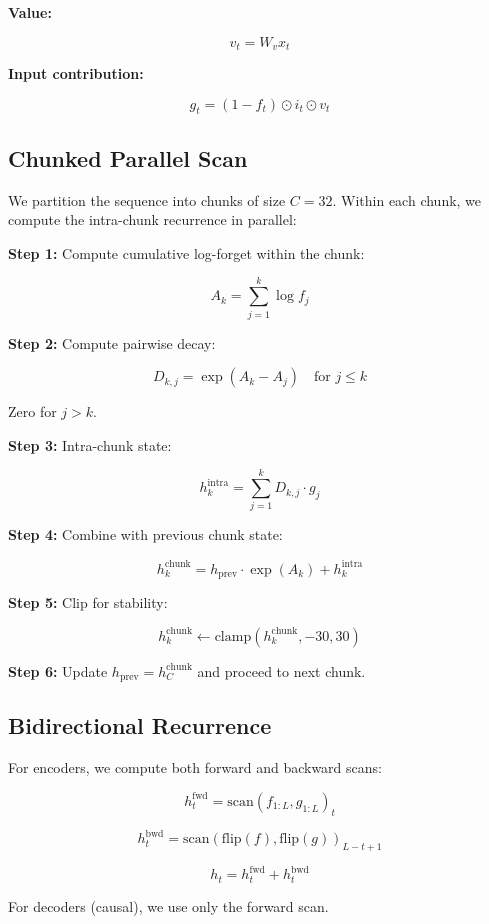 \textbf{Value:}

\[
v_t = W_v x_t
\tag{4.5}
\]

\textbf{Input contribution:}

\[
g_t = (1 - f_t) \odot i_t \odot v_t
\tag{4.6}
\]

\subsection{Chunked Parallel Scan}

We partition the sequence into chunks of size $C = 32$. Within each chunk, 
we compute the intra-chunk recurrence in parallel:

\textbf{Step 1:} Compute cumulative log-forget within the chunk:

\[
A_k = \sum_{j=1}^{k} \log f_j
\tag{4.7}
\]

\textbf{Step 2:} Compute pairwise decay:

\[
D_{k,j} = \exp(A_k - A_j) \quad \text{for } j \leq k
\tag{4.8}
\]

Zero for $j > k$.

\textbf{Step 3:} Intra-chunk state:

\[
h_k^\text{intra} = \sum_{j=1}^{k} D_{k,j} \cdot g_j
\tag{4.9}
\]

\textbf{Step 4:} Combine with previous chunk state:

\[
h_k^\text{chunk} = h_\text{prev} \cdot \exp(A_k) + h_k^\text{intra}
\tag{4.10}
\]

\textbf{Step 5:} Clip for stability:

\[
h_k^\text{chunk} \leftarrow \text{clamp}(h_k^\text{chunk}, -30, 30)
\tag{4.11}
\]

\textbf{Step 6:} Update $h_\text{prev} = h_C^\text{chunk}$ and proceed to next chunk.

\subsection{Bidirectional Recurrence}

For encoders, we compute both forward and backward scans:

\[
h_t^\text{fwd} = \text{scan}(f_{1:L}, g_{1:L})_t
\tag{4.12}
\]

\[
h_t^\text{bwd} = \text{scan}(\text{flip}(f), \text{flip}(g))_{L-t+1}
\tag{4.13}
\]

\[
h_t = h_t^\text{fwd} + h_t^\text{bwd}
\tag{4.14}
\]

For decoders (causal), we use only the forward scan.

